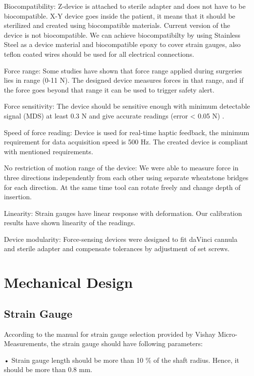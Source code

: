 	Biocompatibility: Z-device is attached to sterile adapter and does not have to be biocompatible. X-Y device goes inside the patient, it means that it should be sterilized and created using biocompatible materials. Current version of the device is not biocompatible. We can achieve biocompatibilty by using Stainless Steel as a device material and biocompatible epoxy to cover strain gauges, also teflon coated wires should be used for all electrical connections.
	
	Force range: Some studies \cite{mack_interactive_2012, prasad_modular_2003, } have shown that force range applied during surgeries lies in range (0-11 N). The designed device measures forces in that range, and if the force goes beyond that range it can be used to trigger safety alert.
	
	Force sensitivity: The device should be sensitive enough with minimum detectable signal (MDS) at least 0.3 N and give accurate readings (error < 0.05 N) \cite{mack_interactive_2012}.
	
	Speed of force reading: Device is used for real-time haptic feedback, the minimum requirement for data acquisition speed is 500 Hz. The created device is compliant with mentioned requirements.
	
	No restriction of motion range of the device: We were able to measure force in three directions independently from each other using separate wheatstone bridges for each direction. At the same time tool can rotate freely and change depth of insertion.	
	
	Linearity: Strain gauges have linear response with deformation. Our calibration results have shown linearity of the readings.

	Device modularity: Force-sensing devices were designed to fit daVinci cannula and sterile adapter and compensate tolerances by adjustment of set screws.
	
\section{Mechanical Design}
\label{sec:mechDes}

	\subsection{Strain Gauge}
	\label{sec:SGReq}
	According to the manual for strain gauge selection provided by Vishay Micro-Measurements, the strain gauge should have following parameters:
	
	• Strain gauge length should be more than 10 \% of the shaft radius. Hence, it should be more than 0.8 mm.
	
